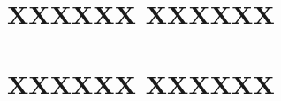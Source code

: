 \documentclass[paper=a4, fontsize=11pt]{scrartcl} %
\numberwithin{equation}{section} %
\numberwithin{figure}{section} %
\numberwithin{table}{section} %
\begin{document}

\section{XXXXXX XXXXXX}


\section{XXXXXX XXXXXX}

\end{document}
